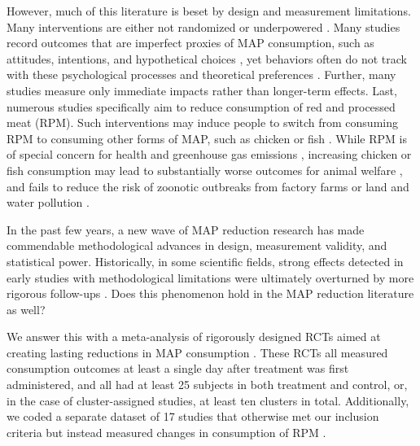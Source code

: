 \documentclass[sn-nature,referee,pdflatex]{sn-jnl}
\begin{document}
However, much of this literature is beset by design and measurement
limitations. Many interventions are either not randomized
\citep{garnett2020} or underpowered \citep{delichatsios2001}. Many
studies record outcomes that are imperfect proxies of MAP consumption,
such as attitudes, intentions, and hypothetical choices
\citep{raghoebar2020, vermeer2010}, yet behaviors often do not track
with these psychological processes
\citep{mathur2021effectiveness, porat2024} and theoretical preferences
\citep{hensher2010}. Further, many studies measure only immediate
impacts \citep{hansen2021, griesoph2021} rather than longer-term
effects. Last, numerous studies specifically aim to reduce consumption
of red and processed meat (RPM). Such interventions may induce people to
switch from consuming RPM to consuming other forms of MAP, such as
chicken or fish \citep{grummon2023}. While RPM is of special concern for
health and greenhouse gas emissions \citep{abete2014, lescinsky2022},
increasing chicken or fish consumption may lead to substantially worse
outcomes for animal welfare \citep{mathur2022ethical}, and fails to
reduce the risk of zoonotic outbreaks from factory farms
\citep{hafez2020} or land and water pollution \citep{grvzinic2023}.

In the past few years, a new wave of MAP reduction research has made
commendable methodological advances in design, measurement validity, and
statistical power. Historically, in some scientific fields, strong
effects detected in early studies with methodological limitations were
ultimately overturned by more rigorous follow-ups
\citep{wykes2008, paluck2019, scheel2021}. Does this phenomenon hold in
the MAP reduction literature as well?

We answer this with a meta-analysis of rigorously designed RCTs aimed at
creating lasting reductions in MAP consumption
\citep{andersson2021, kanchanachitra2020, abrahamse2007, acharya2004, banerjee2019, bianchi2022, bochmann2017, bschaden2020, carfora2023, cooney2014, cooney2016, feltz2022, haile2021, hatami2018, hennessy2016, jalil2023, mathur2021effectiveness, merrill2009, norris2014, peacock2017, polanco2022, sparkman2021, weingarten2022, piester2020, aberman2018, aldoh2023, allen2002, camp2019, coker2022, sparkman2020, berndsen2005, bertolaso2015, fehrenbach2015, mattson2020, shreedhar2021}.
These RCTs all measured consumption outcomes at least a single day after
treatment was first administered, and all had at least 25 subjects in
both treatment and control, or, in the case of cluster-assigned studies,
at least ten clusters in total. Additionally, we coded a separate
dataset of 17 studies that otherwise met our inclusion criteria but
instead measured changes in consumption of RPM
\citep{anderson2017, carfora2017correlational, carfora2017randomised, carfora2019, carfora2019informational, delichatsios2001talking, dijkstra2022, emmons2005cancer, emmons2005project, jaacks2014, james2015, lee2018, lindstrom2015, perino2022, schatzkin2000, sorensen2005, wolstenholme2020}.
\end{document}
